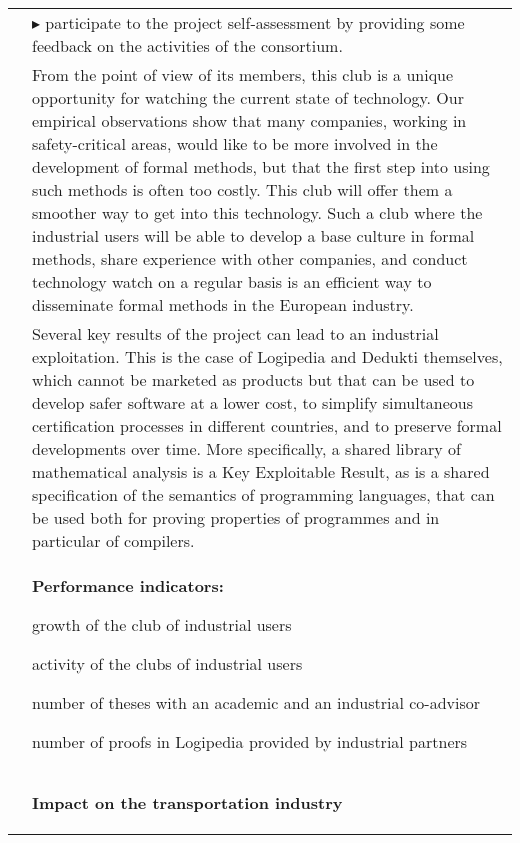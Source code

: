\begin{longtable}{|p{}|p{}|}
&
$\blacktriangleright$ participate to the project self-assessment by providing
some feedback on the activities of the consortium.\\
&
\hspace{0.4cm}
From the point of view of its members, this club is a unique
opportunity for watching the current state of technology. Our empirical observations show that
many companies, working in safety-critical areas, would like to be
more involved in the development of formal methods, but that the first
step into using such methods is often too costly. This club will offer
them a smoother way to get into this technology. Such a club
where the industrial users will be able to develop a base culture in
formal methods, share experience with other companies, and conduct
technology watch on a regular basis is an efficient way to disseminate
formal methods in the European industry.\\
&
\hspace{0.4cm}
Several key results of the project can lead to an industrial
exploitation. This is the case of Logipedia and Dedukti themselves,
which cannot be marketed as products but that can be used to develop safer
software at a lower cost, to simplify simultaneous certification
processes in different countries, and to preserve formal developments
over time. More specifically, a shared library of mathematical analysis is a Key
Exploitable Result, as is a shared specification of the semantics of
programming languages, that can be used both for proving properties of
programmes and in particular of compilers.\\
&\colorbox{color3}{\bf Performance indicators:}
\begin{compactitem}
  \item growth of the club of industrial users
  \item activity of the clubs of industrial users
  \item number of theses with an academic and an industrial co-advisor
  \item number of proofs in Logipedia provided by industrial partners
\end{compactitem}
\\
&
\definecolor{shadecolor}{named}{color2}
\begin{shaded}
{\bf\large Impact on the transportation industry}


\end{shaded}
\end{longtable}
